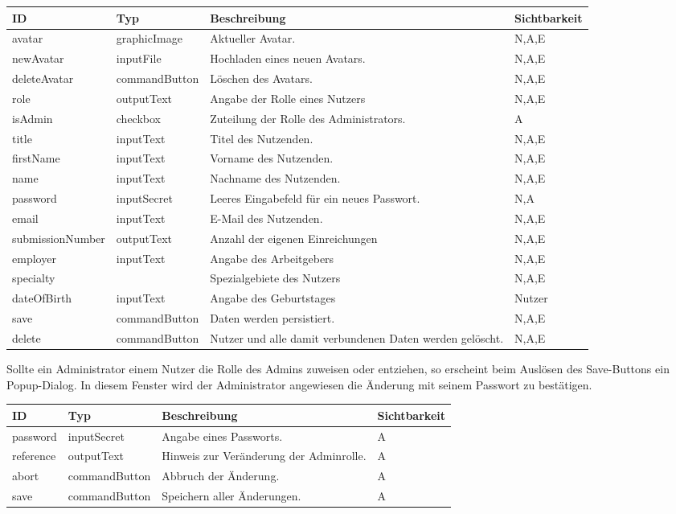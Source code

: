 \begin{tabular}[H]{|m{2cm}|m{3cm}|m{6cm}|m{2.5cm}|}
    \hline
    \textbf{ID} & \textbf{Typ} & \textbf{Beschreibung} & \textbf{Sichtbarkeit} \\
    \hline
    \hline
    avatar & graphicImage & Aktueller Avatar. & N,A,E\\
    \hline
    newAvatar & inputFile & Hochladen eines neuen Avatars. & N,A,E\\
    \hline
    deleteAvatar & commandButton & Löschen des Avatars. & N,A,E\\
    \hline
    role & outputText & Angabe der Rolle eines Nutzers & N,A,E\\
    \hline
    isAdmin & checkbox & Zuteilung der Rolle des Administrators. & A\\
    \hline
    title & inputText & Titel des Nutzenden. & N,A,E\\
    \hline
    firstName & inputText & Vorname des Nutzenden. & N,A,E\\
    \hline
    name & inputText & Nachname des Nutzenden. & N,A,E\\
    \hline
    password & inputSecret & Leeres Eingabefeld für ein neues Passwort. & N,A\\
    \hline
    email & inputText & E-Mail des Nutzenden. & N,A,E\\
    \hline
    submissionNumber & outputText & Anzahl der eigenen Einreichungen & N,A,E\\
    \hline
    employer & inputText & Angabe des Arbeitgebers & N,A,E\\
    \hline
    specialty & & Spezialgebiete des Nutzers & N,A,E \\
    \hline
    dateOfBirth & inputText & Angabe des Geburtstages & Nutzer\\
    \hline
    save & commandButton & Daten werden persistiert. & N,A,E\\
    \hline
    delete & commandButton & Nutzer und alle damit verbundenen Daten werden gelöscht. & N,A,E\\
    \hline
\end{tabular}

Sollte ein Administrator einem Nutzer die Rolle des Admins zuweisen oder entziehen, so erscheint beim Auslösen des Save-Buttons ein Popup-Dialog.
In diesem Fenster  wird der Administrator angewiesen die Änderung mit seinem Passwort zu bestätigen.

\begin{tabular}[H]{|m{2cm}|m{3cm}|m{6cm}|m{2.5cm}|}
    \hline
    \textbf{ID} & \textbf{Typ} & \textbf{Beschreibung} & \textbf{Sichtbarkeit} \\
    \hline
    \hline
    password & inputSecret & Angabe eines Passworts. & A\\
    \hline
    reference & outputText & Hinweis zur Veränderung der Adminrolle. & A\\
    \hline
    abort & commandButton & Abbruch der Änderung. & A\\
    \hline
    save & commandButton & Speichern aller Änderungen. & A\\
    \hline
\end{tabular}

